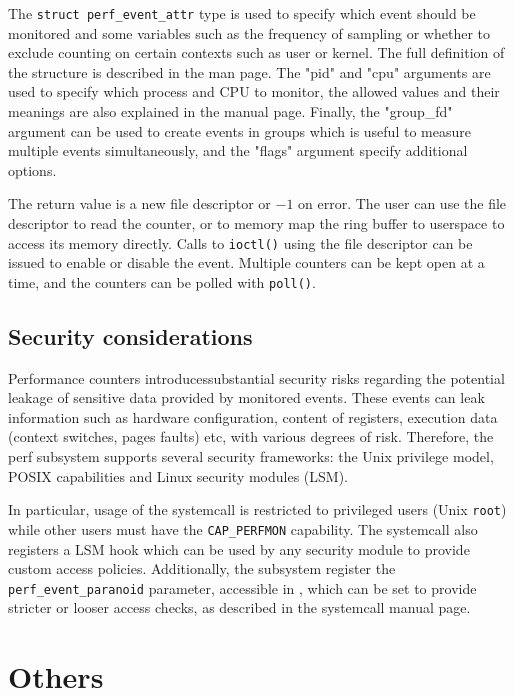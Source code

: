 The \verb|struct perf_event_attr| type is used to specify which event should be
monitored and some variables such as the frequency of sampling or whether to
exclude counting on certain contexts such as user or kernel. The full definition
of the structure is described in the man page. The "pid" and "cpu" arguments are
used to specify which process and CPU to monitor, the allowed values and their
meanings are also explained in the manual page. Finally, the "group\_fd"
argument can be used to create events in groups which is useful to measure
multiple events simultaneously, and the "flags" argument specify additional
options.

The return value is a new file descriptor or $-1$ on error. The user can use the
file descriptor to read the counter, or to memory map the ring buffer to
userspace to access its memory directly. Calls to \verb|ioctl()| using the file
descriptor can be issued to enable or disable the event. Multiple counters can
be kept open at a time, and the counters can be polled with \verb|poll()|.

\subsection{Security considerations}

Performance counters introducessubstantial security risks regarding the
potential leakage of sensitive data provided by monitored events. These events
can leak information such as hardware configuration, content of registers,
execution data (context switches, pages faults) etc, with various degrees of
risk. Therefore, the perf subsystem supports several security frameworks: the
Unix privilege model, POSIX capabilities and Linux security modules (LSM).

In particular, usage of the systemcall is restricted to privileged users (Unix
\verb|root|) while other users must have the \verb|CAP_PERFMON| capability. The
systemcall also registers a LSM hook which can be used by any security module to
provide custom access policies. Additionally, the subsystem register the
\verb|perf_event_paranoid| parameter, accessible in
, which can be set to provide
stricter or looser access checks, as described in the systemcall manual page.

\section{Others}


